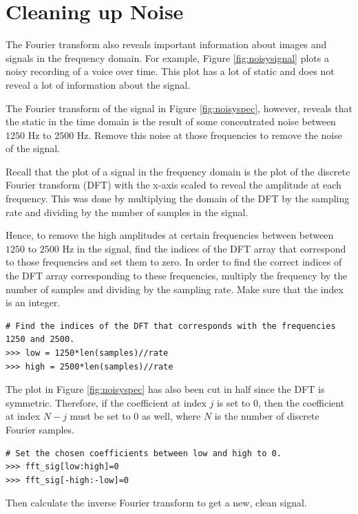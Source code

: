 \section*{Cleaning up Noise} %

The Fourier transform also reveals important information about images and signals in the frequency domain. 
For example, Figure \ref{fig:noisysignal} plots a noisy recording of a voice over time. 
This plot has a lot of static and does not reveal a lot of information about the signal. 

The Fourier transform of the signal in Figure \ref{fig:noisyspec}, however, reveals that the static in the time domain is the result of some concentrated noise between $1250$ Hz to  $2500$ Hz. 
Remove this noise at those frequencies to remove the noise of the signal.

Recall that the plot of a signal in the frequency domain is the plot of the discrete Fourier transform (DFT) with the x-axis scaled to reveal the amplitude at each frequency. 
This was done by multiplying the domain of the DFT by the sampling rate and dividing by the number of samples in the signal. 

Hence, to remove the high amplitudes at certain frequencies between between $1250$ to $2500$ Hz in the signal, find the indices of the DFT array that correspond to those frequencies and set them to zero. 
In order to find the correct indices of the DFT array corresponding to these frequencies, multiply the frequency by the number of samples and dividing by the sampling rate. 
Make sure that the index is an integer. 

\begin{lstlisting}
# Find the indices of the DFT that corresponds with the frequencies 1250 and 2500.
>>> low = 1250*len(samples)//rate
>>> high = 2500*len(samples)//rate
\end{lstlisting}

The plot in Figure \ref{fig:noisyspec} has also been cut in half since the DFT is symmetric. 
Therefore, if the coefficient at index $j$ is set to $0$, then the coefficient at index $N - j$  must be set to $0$ as well, where $N$ is the number of discrete Fourier samples.

\begin{lstlisting}
# Set the chosen coefficients between low and high to 0.
>>> fft_sig[low:high]=0
>>> fft_sig[-high:-low]=0
\end{lstlisting}

Then calculate the inverse Fourier transform to get a new, clean signal.

